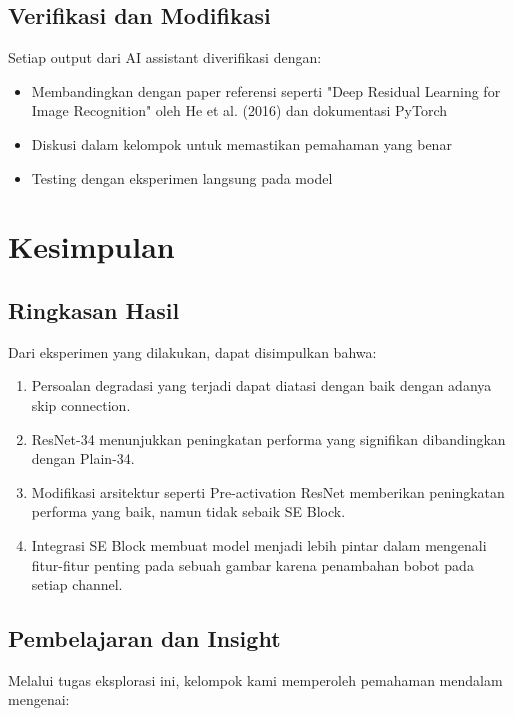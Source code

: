 \documentclass[11pt,a4paper]{article}
\begin{document}
\subsection{Verifikasi dan Modifikasi}

Setiap output dari AI assistant diverifikasi dengan:

\begin{itemize}
    \item Membandingkan dengan paper referensi seperti "Deep Residual Learning for Image Recognition" oleh He et al. (2016) dan dokumentasi PyTorch \cite{pytorch-docs}
    \item Diskusi dalam kelompok untuk memastikan pemahaman yang benar
    \item Testing dengan eksperimen langsung pada model
\end{itemize}

\section{Kesimpulan}

\subsection{Ringkasan Hasil}

Dari eksperimen yang dilakukan, dapat disimpulkan bahwa:

\begin{enumerate}
  	\item Persoalan degradasi yang terjadi dapat diatasi dengan baik dengan adanya skip connection.
    \item ResNet-34 menunjukkan peningkatan performa yang signifikan dibandingkan dengan Plain-34.
    \item Modifikasi arsitektur seperti Pre-activation ResNet memberikan peningkatan performa yang baik, namun tidak sebaik SE Block.
    \item Integrasi SE Block membuat model menjadi lebih pintar dalam mengenali fitur-fitur penting pada sebuah gambar karena penambahan bobot pada setiap channel.
\end{enumerate}

\subsection{Pembelajaran dan Insight}

Melalui tugas eksplorasi ini, kelompok kami memperoleh pemahaman mendalam mengenai:
\end{document}
